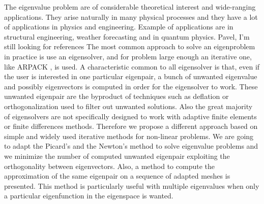 \documentclass[preprint,12pt]{elsarticle}
\begin{document}
The eigenvalue problem are of considerable theoretical interest and wide-ranging applications.
They arise naturally in many physical processes 
and they have a lot of applications in physics and engineering. Example of applications 
are in structural engineering, weather forecasting and in quantum physics. {\red Pavel, I'm still looking for references} The most common approach to solve an eigenproblem in practice is use an eigensolver, and for problem large enough an iterative one, like ARPACK \cite{arpack}, is used.
A characteristic common to all eigensolver is that, even if the user is interested in one particular eigenpair, a bunch of unwanted eigenvalue and possibly eigenvectors is computed in order for the eigensolver to work. These unwanted eigenpair are the byproduct of techniques such as deflation or 
orthogonalization used to filter out unwanted solutions.
Also the great majority of eigensolvers are not specifically designed to work with adaptive finite elements or finite differences methods. Therefore we propose a different approach based on simple and widely used iterative methods for non-linear problems. We are going to adapt the Picard's and the Newton's method to solve eigenvalue problems and we minimize the number of computed unwanted eigenpair exploiting the orthogonality between eigenvectors. Also, a method to compute the approximation of the same eigenpair on a sequence of adapted meshes is presented. This method is particularly useful with multiple eigenvalues when only a particular eigenfunction in the eigenspace is wanted. 

\end{document}
